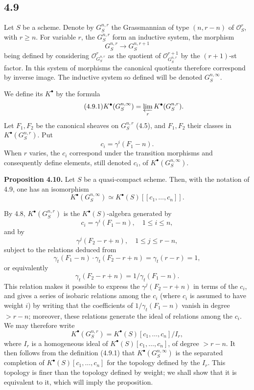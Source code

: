 \subsection*{4.9}
Let \(S\) be a scheme. Denote by \(G_S^{n,r}\) the Grassmannian of type \((n,r-n)\) of \(\mathcal O_S^r\), with \(r\ge n\). For variable \(r\), the \(G_S^{n,r}\) form an inductive system, the morphism
\[
  G_S^{n,r}\longrightarrow G_S^{n,r+1}
\]
being defined by considering \(\mathcal O_{G_S^{n,r}}^r\) as the quotient of \(\mathcal O_{G_S^{n,r}}^{r+1}\) by the \((r+1)\)-st factor. In this system of morphisms the canonical quotients therefore correspond by inverse image. The inductive system so defined will be denoted \(G_S^{n,\infty}\).

We define its \(K^\bullet\) by the formula
\begin{equation}\tag{4.9.1}
  K^\bullet(G_S^{n,\infty})
  = \varprojlim_r K^\bullet(G_S^{n,r}) .
\end{equation}
Let \(F_1,F_2\) be the canonical sheaves on \(G_S^{n,r}\) (4.5), and \(F_1,F_2\) their classes in \(K^\bullet(G_S^{n,r})\). Put
\[
  c_i=\gamma^i(F_1-n).
\]
When \(r\) varies, the \(c_i\) correspond under the transition morphisms and consequently define elements, still denoted \(c_i\), of \(K^\bullet(G_S^{n,\infty})\).

\textbf{Proposition 4.10.} Let \(S\) be a quasi-compact scheme. Then, with the notation of 4.9, one has an isomorphism
\[
  K^\bullet(G_S^{n,\infty})\simeq K^\bullet(S)[[c_1,\ldots,c_n]] .
\]

By 4.8, \(K^\bullet(G_S^{n,r})\) is the \(K^\bullet(S)\)-algebra generated by
\[
  c_i=\gamma^i(F_1-n),\quad 1\le i\le n,
\]
and by
\[
  \gamma^j(F_2-r+n),\quad 1\le j\le r-n,
\]
subject to the relations deduced from
\[
  \gamma_t(F_1-n)\cdot\gamma_t(F_2-r+n)
  = \gamma_t(r-r)=1,
\]
or equivalently
\[
  \gamma_t(F_2-r+n)=1/\gamma_t(F_1-n).
\]
This relation makes it possible to express the \(\gamma^j(F_2-r+n)\) in terms of the \(c_i\), and gives a series of isobaric relations among the \(c_i\) (where \(c_i\) is assumed to have weight \(i\)) by writing that the coefficients of \(1/\gamma_t(F_1-n)\) vanish in degree \(>r-n\); moreover, these relations generate the ideal of relations among the \(c_i\). We may therefore write
\[
  K^\bullet(G_S^{n,r})=K^\bullet(S)[c_1,\ldots,c_n]/I_r,
\]
where \(I_r\) is a homogeneous ideal of \(K^\bullet(S)[c_1,\ldots,c_n]\), of degree \(>r-n\). It then follows from the definition (4.9.1) that \(K^\bullet(G_S^{n,\infty})\) is the separated completion of \(K^\bullet(S)[c_1,\ldots,c_n]\) for the topology defined by the \(I_r\). This topology is finer than the topology defined by weight; we shall show that it is equivalent to it, which will imply the proposition.

